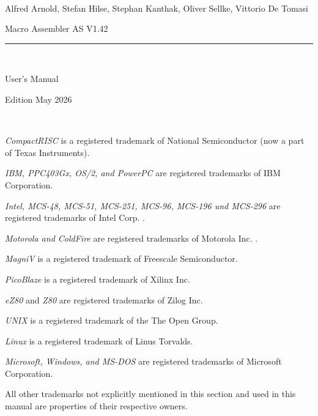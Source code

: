 \documentclass[12pt,twoside]{report}
\newcommand{\asname}{{AS}}
\begin{document}
\thispagestyle{empty}

\
\vspace{7cm}\par

\begin{raggedright}
{\large Alfred Arnold, Stefan Hilse, Stephan Kanthak, Oliver
 Sellke, Vittorio De Tomasi}
\vspace{1cm}\par
{\huge Macro Assembler \asname{} V1.42}\\
\rule{9.5cm}{0.3mm}\\
\vspace{2mm}\par
{\huge User's Manual}

\vspace{1cm}\par

{\large Edition May 2026}
\end{raggedright}

\clearpage
\thispagestyle{empty}

\ \vspace{5cm}

{\em CompactRISC} is a registered trademark of National
 Semiconductor (now a part of Texas Instruments).

{\em IBM, PPC403Gx, OS/2, and PowerPC} are registered trademarks of IBM
Corporation.

{\em Intel, MCS-48, MCS-51, MCS-251, MCS-96, MCS-196 und MCS-296} are
registered trademarks of Intel Corp. .

{\em Motorola and ColdFire} are registered trademarks of Motorola Inc. .

{\em MagniV} is a registered trademark of Freescale Semiconductor.

{\em PicoBlaze} is a registered trademark of Xilinx Inc.

{\em eZ80} and {\em Z80} are registered trademarks of Zilog Inc. 

{\em UNIX} is a registered trademark of the The Open Group.

{\em Linux} is a registered trademark of Linus Torvalds.

{\em Microsoft, Windows, and MS-DOS} are registered trademarks of
Microsoft Corporation.

All other trademarks not explicitly mentioned in this section and used in
this manual are properties of their respective owners.

\vspace{5cm}
\end{document}
